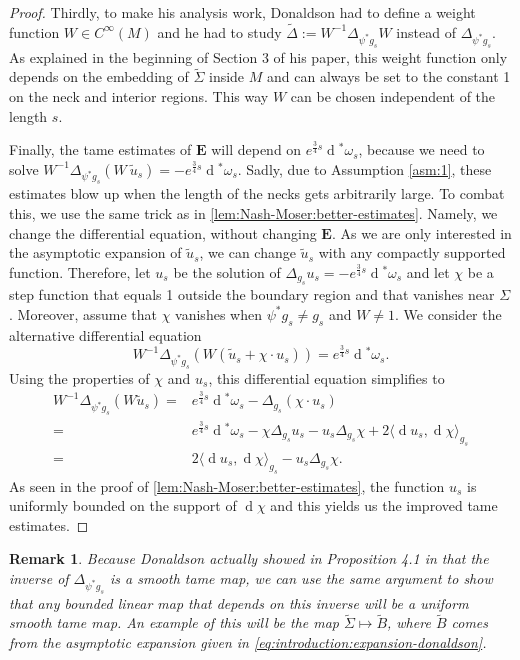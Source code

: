 \documentclass[preprint,12pt]{elsarticle}
\numberwithin{table}{section}
\newtheorem{remark}[lemma]{Remark}
\renewcommand{\d}{\operatorname{d}\!}
\begin{document}
\begin{proof}
	Thirdly, to make his analysis work, Donaldson had to define a weight function $W \in C^\infty(M)$ and he had to study $\tilde\Delta := W^{-1} \Delta_{\psi^* g_s} W$ instead of $\Delta_{\psi^* g_s}$. As explained in the beginning of Section 3 of his paper, this weight function only depends on the embedding of $\tilde \Sigma$ inside $M$ and can always be set to the constant 1 on the neck and interior regions. This way $W$ can be chosen independent of the length $s$.	
	
	Finally, the tame estimates of $\mathbf{E}$ will depend on $e^{\frac{3}{4}s} \d^* \omega_s$, because we need to solve $W^{-1} \Delta_{\psi^* g_s} (W \: \tilde u_s) = - e^{\frac{3}{4}s} \d^* \omega_s$. Sadly, due to Assumption \ref{asm:1}, these estimates blow up when the length of the necks gets arbitrarily large. To combat this, we use the same trick as in \cref{lem:Nash-Moser:better-estimates}. Namely, we change the differential equation, without changing $\mathbf{E}$. As we are only interested in the asymptotic expansion of $\tilde u_s$, we can change $\tilde u_s$ with any compactly supported function. Therefore, let $u_s$ be the solution of $\Delta_{g_s} u_s = - e^{\frac{3}{4}s} \d^* \omega_s$ and let $\chi$ be a step function that equals 1 outside the boundary region and that vanishes near $\Sigma$. Moreover, assume that $\chi$ vanishes when $\psi^* g_s \not = g_s$ and $W \not = 1$. We consider the alternative differential equation
	$$
	W^{-1} \Delta_{\psi^* g_s} (W (\tilde u_s + \chi \cdot u_s)) = e^{\frac{3}{4}s} \d^* \omega_s.
	$$
	Using the properties of $\chi$ and $u_s$, this differential equation simplifies to 
	\begin{align}
		W^{-1} \Delta_{\psi^* g_s} (W \tilde u_s ) 
		=& e^{\frac{3}{4}s} \d^* \omega_s - \Delta_{g_s} (\chi \cdot u_s) \\
		=& e^{\frac{3}{4}s} \d^* \omega_s - \chi \Delta_{g_s} u_s - u_s \Delta_{g_s} \chi + 2 \langle \d u_s, \d \chi \rangle_{g_s} \\
		=& 2 \langle \d u_s, \d \chi \rangle_{g_s} - u_s \Delta_{g_s} \chi.
	\end{align}
	As seen in the proof of \cref{lem:Nash-Moser:better-estimates}, the function $u_s$ is uniformly bounded on the support of $\d \chi$ and this yields us the improved tame estimates.
\end{proof}
\begin{remark}
	\label{rem:estimates-of-B}
	Because Donaldson actually showed in Proposition 4.1 in \cite{Donaldson2021} that the inverse of $\Delta_{\psi^* g_s}$ is a smooth tame map, we can use the same argument to show that any bounded linear map that depends on this inverse will be a uniform smooth tame map. An example of this will be the map $\tilde \Sigma \mapsto \tilde B$, where $\tilde B$ comes from the asymptotic expansion given in \cref{eq:introduction:expansion-donaldson}.
\end{remark}
\end{document}
